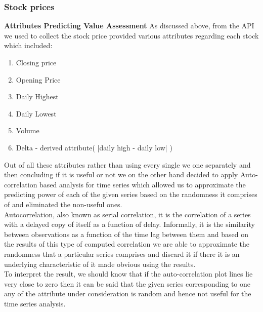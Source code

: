 \documentclass[sigconf, nonacm]{acmart}
\begin{document}
\subsubsection{Stock prices}
\textbf{Attributes Predicting Value Assessment }
As discussed above, from the API we used to collect the stock price provided various attributes regarding each stock which included:
\begin{enumerate}
    \item Closing price
    \item Opening Price
    \item Daily Highest
    \item Daily Lowest
    \item Volume
    \item Delta - derived attribute( |daily high - daily low| )
    
\end{enumerate}
Out of all these attributes rather than using every single we one separately and then concluding if it is useful or not we on the other hand decided to apply Auto-correlation based analysis for time series which allowed us to approximate the predicting power of each of the given series based on the randomness it comprises of and eliminated the non-useful ones. 
\\Autocorrelation, also known as serial correlation, it is the correlation of a series with a delayed copy of itself as a function of delay. Informally, it is the similarity between observations as a function of the time lag between them and based on the results of this type of computed correlation we are able to approximate the randomness that a particular series comprises and discard it if there it is an underlying characteristic of it made obvious using the results.
\\ To interpret the result, we should know that if the auto-correlation plot lines lie very close to zero then it can be said that the given series corresponding to one any of the attribute under consideration is random and hence not useful for the time series analysis.
\end{document}
